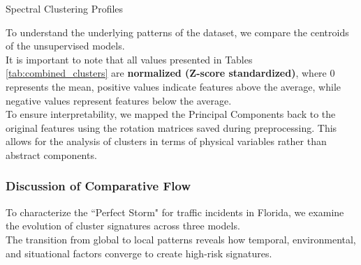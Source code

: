 \documentclass[conference]{IEEEtran}
\begin{document}
\begin{table}[ht]
	\centering Spectral Clustering Profiles
	\smallskip
\end{table}

To understand the underlying patterns of the dataset, we compare the centroids of the unsupervised models.\\
\indent It is important to note that all values presented in Tables \ref{tab:combined_clusters} are \textbf{normalized (Z-score standardized)}, where $0$ represents the mean, positive values indicate features above the average, while negative values represent features below the average.\\
\indent To ensure interpretability, we mapped the Principal Components back to the original features using the rotation matrices saved during preprocessing. This allows for the analysis of clusters in terms of physical variables rather than abstract components.

\subsubsection*{\textbf{Discussion of Comparative Flow}}
To characterize the ``Perfect Storm" for traffic incidents in Florida, we examine the evolution of cluster signatures across three models.\\
\indent The transition from global to local patterns reveals how temporal, environmental, and situational factors converge to create high-risk signatures.
\end{document}
